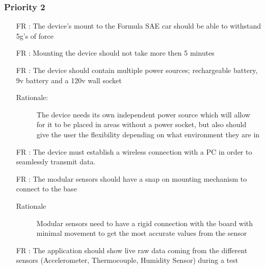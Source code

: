 \documentclass[12pt]{article}
\newcounter{reqnum} %
\begin{document}
\newpage

\subsubsection{Priority 2}
\begin{itemize}

  \item[FR \refstepcounter{reqnum}\thereqnum:] The device's mount to the Formula SAE car should be able to withstand 5g's of force
  
  \item[FR \refstepcounter{reqnum}\thereqnum:] Mounting the device should not take more then 5 minutes

  \item[FR \refstepcounter{reqnum}\thereqnum:] The device should contain multiple power sources; rechargeable battery, 9v battery and a 120v wall socket
  \begin{description} \item[Rationale:] The device needs its own independent power source which will allow for it to be placed in areas without a power socket, but also should give the user the flexibility depending on what environment they are in \end{description}

  \item[FR \refstepcounter{reqnum}\thereqnum:] The device must establish a wireless connection with a PC in order to seamlessly transmit data.
  
  \item[FR \refstepcounter{reqnum}\thereqnum:] The modular sensors should have a snap on mounting mechanism to connect to the base
  \begin{description} \item[Rationale] Modular sensors need to have a rigid connection with the board with minimal movement to get the most accurate values from the sensor  \end{description}

  \item[FR \refstepcounter{reqnum}\thereqnum:] The application should show live raw data coming from the different sensors (Accelerometer, Thermocouple, Humidity Sensor) during a test

  \end{itemize}
\end{document}

